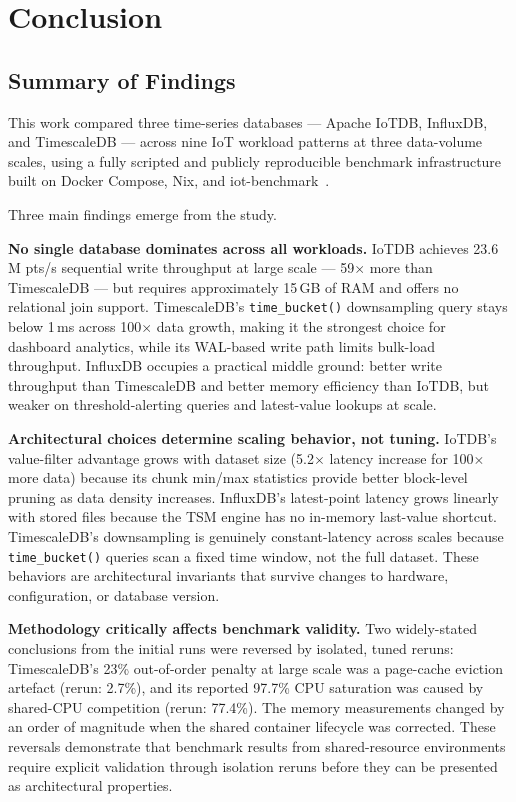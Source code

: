 \section{Conclusion}
\label{sec:conclusion}

\subsection{Summary of Findings}

This work compared three time-series databases --- Apache IoTDB, InfluxDB, and TimescaleDB
--- across nine IoT workload patterns at three data-volume scales, using a fully scripted
and publicly reproducible benchmark infrastructure built on Docker Compose, Nix, and
iot-benchmark~\cite{iotbenchmark}.

Three main findings emerge from the study.

\textbf{No single database dominates across all workloads.} IoTDB achieves 23.6\,M pts/s
sequential write throughput at large scale --- 59$\times$ more than TimescaleDB --- but
requires approximately 15\,GB of RAM and offers no relational join support.
TimescaleDB's \texttt{time\_bucket()} downsampling query stays below 1\,ms across 100$\times$
data growth, making it the strongest choice for dashboard analytics, while its WAL-based
write path limits bulk-load throughput. InfluxDB occupies a practical middle ground:
better write throughput than TimescaleDB and better memory efficiency than IoTDB, but
weaker on threshold-alerting queries and latest-value lookups at scale.

\textbf{Architectural choices determine scaling behavior, not tuning.}
IoTDB's value-filter advantage grows with dataset size (5.2$\times$ latency increase for
100$\times$ more data) because its chunk min/max statistics provide better block-level
pruning as data density increases. InfluxDB's latest-point latency grows linearly with
stored files because the TSM engine has no in-memory last-value shortcut. TimescaleDB's
downsampling is genuinely constant-latency across scales because \texttt{time\_bucket()}
queries scan a fixed time window, not the full dataset. These behaviors are architectural
invariants that survive changes to hardware, configuration, or database version.

\textbf{Methodology critically affects benchmark validity.}
Two widely-stated conclusions from the initial runs were reversed by isolated, tuned reruns:
TimescaleDB's 23\% out-of-order penalty at large scale was a page-cache eviction artefact
(rerun: 2.7\%), and its reported 97.7\% CPU saturation was caused by shared-CPU competition
(rerun: 77.4\%). The memory measurements changed by an order of magnitude when the shared
container lifecycle was corrected. These reversals demonstrate that benchmark results from
shared-resource environments require explicit validation through isolation reruns before
they can be presented as architectural properties.

